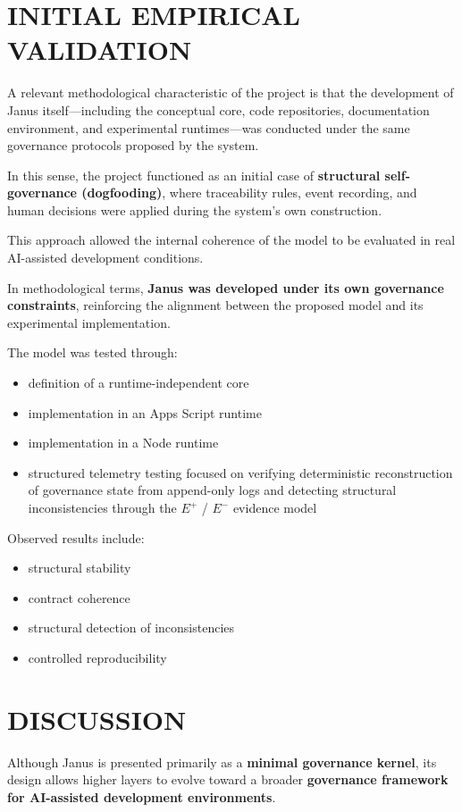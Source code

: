 \documentclass[conference]{IEEEtran}
\begin{document}
\section{INITIAL EMPIRICAL VALIDATION}
A relevant methodological characteristic of the project is that the development of Janus itself---including the conceptual core, code repositories, documentation environment, and experimental runtimes---was conducted under the same governance protocols proposed by the system.

In this sense, the project functioned as an initial case of \textbf{structural self-governance (dogfooding)}, where traceability rules, event recording, and human decisions were applied during the system’s own construction.

This approach allowed the internal coherence of the model to be evaluated in real AI-assisted development conditions.

In methodological terms, \textbf{Janus was developed under its own governance constraints}, reinforcing the alignment between the proposed model and its experimental implementation.

The model was tested through:
\begin{itemize}
  \item definition of a runtime-independent core
  \item implementation in an Apps Script runtime
  \item implementation in a Node runtime
  \item structured telemetry testing focused on verifying deterministic reconstruction of governance state from append-only logs and detecting structural inconsistencies through the $E^{+}$ / $E^{-}$ evidence model
\end{itemize}

Observed results include:
\begin{itemize}
  \item structural stability
  \item contract coherence
  \item structural detection of inconsistencies
  \item controlled reproducibility
\end{itemize}

\section{DISCUSSION}
Although Janus is presented primarily as a \textbf{minimal governance kernel}, its design allows higher layers to evolve toward a broader \textbf{governance framework for AI-assisted development environments}.
\end{document}
